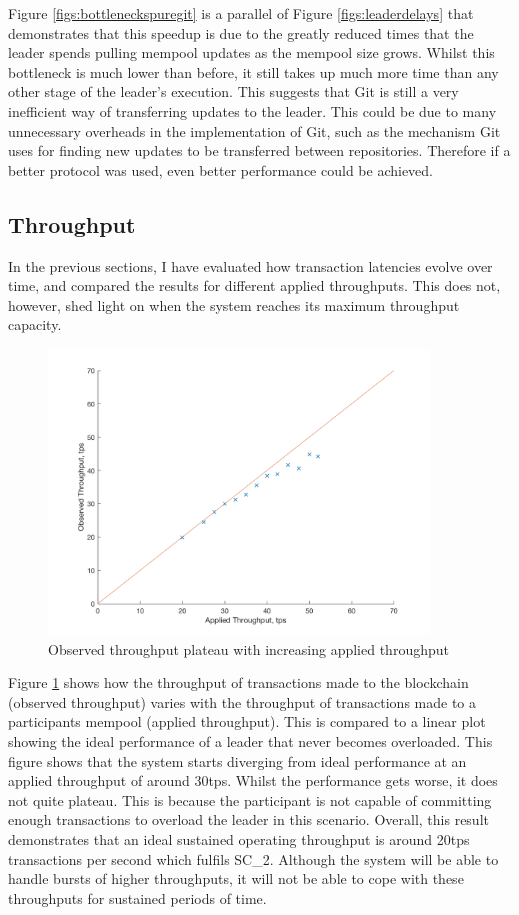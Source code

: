 \documentclass[12pt,a4paper,twoside,openright]{report}
\begin{document}
	Figure \ref{figs:bottleneckspuregit} is a parallel of Figure \ref{figs:leaderdelays} that demonstrates that this speedup is due to the greatly reduced times that the leader spends pulling mempool updates as the mempool size grows.
	Whilst this bottleneck is much lower than before, it still takes up much more time than any other stage of the leader's execution.
	This suggests that Git is still a very inefficient way of transferring updates to the leader.  
	This could be due to many unnecessary overheads in the implementation of Git, such as the mechanism Git uses for finding new updates to be transferred between repositories. 
	Therefore if a better protocol was used, even better performance could be achieved.\\

	\subsection{Throughput}
	In the previous sections, I have evaluated how transaction latencies evolve over time, and compared the results for different applied throughputs.
	This does not, however, shed light on when the system reaches its maximum throughput capacity.
	\begin{figure}
		\includegraphics[width=0.9\textwidth] {figs/appliedvsobservedsingle.png}
		\caption{Observed throughput plateau with increasing applied throughput}
		\label{figs:appliedobservedsingle}
	\end{figure}
	Figure \ref{figs:appliedobservedsingle} shows how the throughput of transactions made to the blockchain (observed throughput) varies with the throughput of transactions made to a participants mempool (applied throughput). 
	This is compared to a linear plot showing the ideal performance of a leader that never becomes overloaded.
	This figure shows that the system starts diverging from ideal performance at an applied throughput of around 30tps.
	Whilst the performance gets worse, it does not quite plateau.
	This is because the participant is not capable of committing enough transactions to overload the leader in this scenario.
	Overall, this result demonstrates that an ideal sustained operating throughput is around 20tps transactions per second which fulfils SC\_2.
	Although the system will be able to handle bursts of higher throughputs, it will not be able to cope with these throughputs for sustained periods of time.
\end{document}
